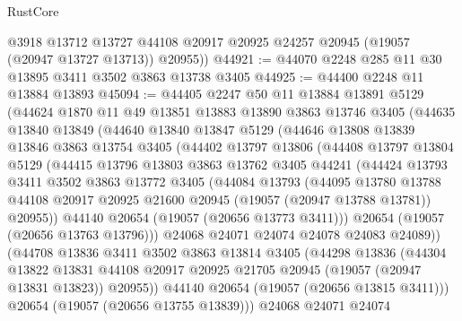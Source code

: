 \begin{lexlean}{RustCore}
\begin{coremodule}
        @3918
        @13712
        @13727
        @44108
        @20917
        @20925
        @24257
        @20945
        (@19057 (@20947 @13727 @13713))
        @20955))
@44921 := @44070 @2248 @285 @11 @30 @13895 @3411 @3502 @3863 @13738 @3405
@44925 := @44400 @2248 @11 @13884 @13893
@45094 := @44405
    @2247
    @50
    @11
    @13884
    @13891
    @5129
    (@44624
      @1870
      @11
      @49
      @13851
      @13883
      @13890
      @3863
      @13746
      @3405
      (@44635
        @13840
        @13849
        (@44640
          @13840
          @13847
          @5129
          (@44646
            @13808
            @13839
            @13846
            @3863
            @13754
            @3405
            (@44402
              @13797
              @13806
              (@44408
                @13797
                @13804
                @5129
                (@44415
                  @13796
                  @13803
                  @3863
                  @13762
                  @3405
                  @44241
                  (@44424
                    @13793
                    @3411
                    @3502
                    @3863
                    @13772
                    @3405
                    (@44084
                      @13793
                      (@44095
                        @13780
                        @13788
                        @44108
                        @20917
                        @20925
                        @21600
                        @20945
                        (@19057 (@20947 @13788 @13781))
                        @20955))
                    @44140
                    @20654
                    (@19057 (@20656 @13773 @3411)))
                  @20654
                  (@19057 (@20656 @13763 @13796)))
                @24068
                @24071
                @24074
                @24078
                @24083
                @24089))
            (@44708
              @13836
              @3411
              @3502
              @3863
              @13814
              @3405
              (@44298
                @13836
                (@44304
                  @13822
                  @13831
                  @44108
                  @20917
                  @20925
                  @21705
                  @20945
                  (@19057 (@20947 @13831 @13823))
                  @20955))
              @44140
              @20654
              (@19057 (@20656 @13815 @3411)))
            @20654
            (@19057 (@20656 @13755 @13839)))
          @24068
          @24071
          @24074

\end{coremodule}
\end{lexlean}
